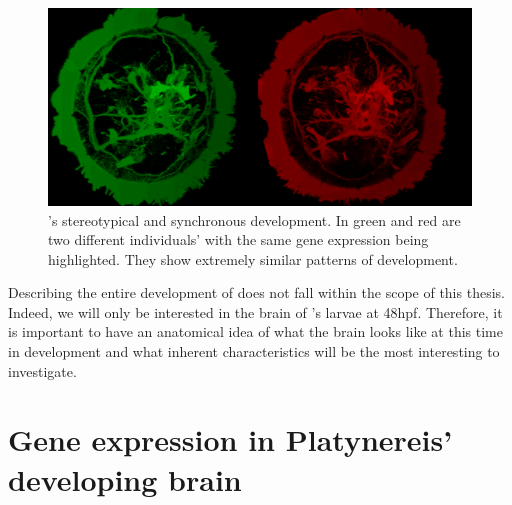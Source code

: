 \begin{figure}[bth]
  \includegraphics[width=\linewidth]{gfx/chapter1/brain_comparison.png}
  \caption{\platyfull{}'s stereotypical and synchronous development. In green and red are two different \platy{} individuals' with the same gene expression being highlighted. They show extremely similar patterns of development.}
  \label{fig:brain_comparison}
\end{figure}

	 Describing the entire development of \platy{} does not fall within the scope of this thesis. Indeed, we will only be interested in the brain of \platy{}'s larvae at 48hpf. Therefore, it is important to have an anatomical idea of what the brain looks like at this time in development and what inherent characteristics will be the most interesting to investigate.

\section{Gene expression in Platynereis' developing brain}\label{sec:gene_expression_background}
